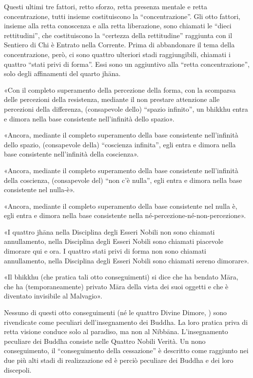
 Questi ultimi tre fattori, retto sforzo, retta
presenza mentale e retta concentrazione, tutti insieme costituiscono la
“concentrazione”. Gli otto fattori, insieme alla retta conoscenza e alla retta
liberazione, sono chiamati le “dieci rettitudini”, che costituiscono la
“certezza della rettitudine” raggiunta con il Sentiero di Chi è Entrato nella
Corrente. Prima di abbandonare il tema della concentrazione, però, ci sono
quattro ulteriori stadi raggiungibili, chiamati i quattro “stati privi di
forma”. Essi sono un aggiuntivo alla “retta concentrazione”, solo degli
affinamenti del quarto jhāna.

 «Con il completo superamento della percezione della forma,
con la scomparsa delle percezioni della resistenza, mediante il non prestare
attenzione alle percezioni della differenza, (consapevole dello) “spazio
infinito”, un bhikkhu entra e dimora nella base consistente nell’infinità dello
spazio».

«Ancora, mediante il completo superamento della base consistente nell’infinità
dello spazio, (consapevole della) “coscienza infinita”, egli entra e dimora
nella base consistente nell’infinità della coscienza».

«Ancora, mediante il completo superamento della base consistente nell’infinità
della coscienza, (consapevole del) “non c’è nulla”, egli entra e dimora nella
base consistente nel nulla-è».

«Ancora, mediante il completo superamento della base consistente nel nulla è,
egli entra e dimora nella base consistente nella
né-percezione-né-non-percezione».

«I quattro jhāna nella Disciplina degli Esseri Nobili non sono chiamati
annullamento, nella Disciplina degli Esseri Nobili sono chiamati piacevole
dimorare qui e ora. I quattro stati privi di forma non sono chiamati
annullamento, nella Disciplina degli Esseri Nobili sono chiamati sereno
dimorare».


«Il bhikkhu (che pratica tali otto conseguimenti) si dice che ha bendato Māra,
che ha (temporaneamente) privato Māra della vista dei suoi oggetti e che è
diventato invisibile al Malvagio».


 Nessuno di questi otto conseguimenti (né le
quattro Divine Dimore, \hyperlink{cap-10-Il-periodo-di-mezzo#pag200b}{}) sono
rivendicate come peculiari dell’insegnamento dei Buddha. La loro pratica priva
di retta visione conduce solo al paradiso, ma non al Nibbāna. L’insegnamento
peculiare dei Buddha consiste nelle Quattro Nobili Verità. Un nono
conseguimento, il “conseguimento della cessazione” è descritto come raggiunto
nei due più alti stadi di realizzazione ed è perciò peculiare dei Buddha e dei
loro discepoli.

